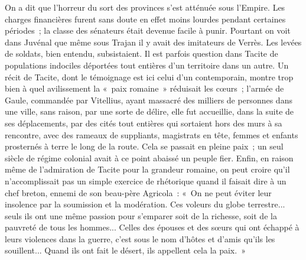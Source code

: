 \documentclass[french,twoside]{book} %
\begin{document}
On a dit que l'horreur du sort des provinces s'est atténuée sous l'Empire. Les charges financières furent sans doute en effet moins lourdes pendant certaines périodes ; la classe des sénateurs était devenue facile à punir. Pour­tant on voit dans Juvénal que même sous Trajan il y avait des imitateurs de Verrès. Les levées de soldats, bien entendu, subsistaient. Il est parfois ques­tion dans Tacite de populations indociles déportées tout entières d'un territoire dans un autre. Un récit de Tacite, dont le témoignage est ici celui d'un contem­porain, montre trop bien à quel avilissement la « paix romaine » réduisait les cœurs ; l'armée de Gaule, commandée par Vitellius, ayant massacré des milliers de personnes dans une ville, sans raison, par une sorte de délire, elle fut accueillie, dans la suite de ses déplacements, par des cités tout entières qui sortaient hors des murs à sa rencontre, avec des rameaux de suppliants, magistrats en tête, femmes et enfants prosternés à terre le long de la route. Cela se passait en pleine paix ; un seul siècle de régime colonial avait à ce point abaissé un peuple fier. Enfin, en raison même de l'admiration de Tacite pour la grandeur romaine, on peut croire qu'il n'accomplissait pas un simple exercice de rhétorique quand il faisait dire à un chef breton, ennemi de son beau-père Agricola : « On ne peut éviter leur insolence par la soumission et la modération. Ces voleurs du globe terrestre... seuls ils ont une même passion pour s'emparer soit de la richesse, soit de la pauvreté de tous les hommes... Celles des épouses et des sœurs qui ont échappé à leurs violences dans la guerre, c'est sous le nom d'hôtes et d'amis qu'ils les souillent... Quand ils ont fait le désert, ils appellent cela la paix. »\par
\end{document}
